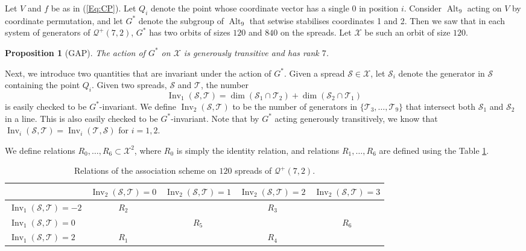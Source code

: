 \documentclass[10pt,a4paper]{amsart}
\newtheorem{prop}[thm]{Proposition}
\newcommand{\mq}{\mathcal Q}
\newcommand{\ms}{\mathcal S}
\newcommand{\mt}{\mathcal T}
\newcommand{\mx}{\mathcal X}
\DeclareMathOperator{\Alt}{Alt}
\DeclareMathOperator{\Inv}{Inv}
\begin{document}
Let $V$ and $f$ be as in (\ref{Eq:CP}).
Let $Q_i$ denote the point whose coordinate vector has a single 0 in position $i$.
Consider $\Alt_9$ acting on $V$ by coordinate permutation, and let $G^*$ denote the subgroup of $\Alt_9$ that setwise stabilises coordinates 1 and 2.
Then we saw that in each system of generators of $\mq^+(7,2)$, $G^*$ has two orbits of sizes $120$ and $840$ on the spreads.
Let $\mx$ be such an orbit of size $120$.

\begin{prop}[GAP]
 \label{Prop:Gen Trans}
 The action of $G^*$ on $\mx$ is generously transitive and has rank $7$.
\end{prop}

Next, we introduce two quantities that are invariant under the action of $G^*$.
Given a spread $\ms \in \mx$, let $\ms_i$ denote the generator in $\ms$ containing the point $Q_i$.
Given two spreads, $\ms$ and $\mt$, the number
\[
 \Inv_1(\ms,\mt) = \dim(\ms_1 \cap \mt_2) + \dim(\ms_2 \cap \mt_1)
\]
is easily checked to be $G^*$-invariant.
We define $\Inv_2(\ms,\mt)$ to be the number of generators in $\{\mt_3, \dots, \mt_9\}$ that intersect both $\ms_1$ and $\ms_2$ in a line.
This is also easily checked to be $G^*$-invariant.
Note that by $G^*$ acting generously transitively, we know that $\Inv_i(\ms,\mt) = \Inv_i(\mt,\ms)$ for $i = 1,2$.

We define relations $R_0, \dots, R_6 \subset \mx^2$, where $R_0$ is simply the identity relation, and relations $R_1, \dots, R_6$ are defined using the Table \ref{tab:Assoc1}.

\begin{table}[h!]
 \centering
 \begin{tabular}{|l||c | c | c | c|}
  \hline
  & $\Inv_2(\ms,\mt) = 0$ & $\Inv_2(\ms,\mt) = 1$ & $\Inv_2(\ms,\mt) = 2$ & $\Inv_2(\ms,\mt) = 3$  \\ \hline \hline
  $\Inv_1(\ms,\mt) = -2$ & $R_2$ & & $R_3$ & \\ \hline
  $\Inv_1(\ms,\mt) = 0$ & & $R_5$ & & $R_6$ \\ \hline
  $\Inv_1(\ms,\mt) = 2$ & $R_1$ & & $R_4$ & \\ \hline
 \end{tabular}
 \caption{Relations of the association scheme on $120$ spreads of $\mq^+(7,2)$.}
 \label{tab:Assoc1}
\end{table}
\end{document}
